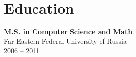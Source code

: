 \documentclass[11pt,a4paper]{article}
\begin{document}
\section{Education}
\begin{multicols}{2}
  \raggedcolumns
  \begin{items}
  \item \textbf{M.S. in Computer Science and Math}\\
    Far Eastern Federal University of Russia\\
    2006 -- 2011
  \end{items}
  \columnbreak
  \hspace{10mm}
\end{multicols}
\end{document}
